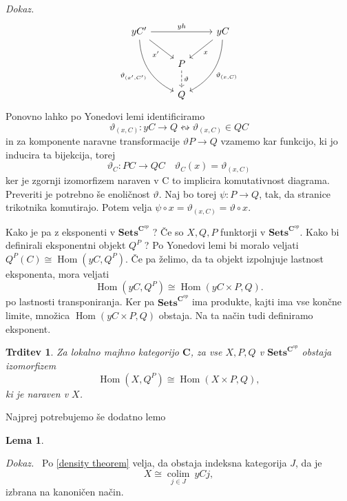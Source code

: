 \documentclass[12pt,a4paper]{book}
\theoremstyle{definition}
\theoremstyle{plain}
\newtheorem{trditev}[definicija]{Trditev}
\newtheorem{lema}[definicija]{Lema}
\newenvironment{dokaz}{\emph{Dokaz.}\ }{\hspace{\fill}{$\Box$}}
\theoremstyle{definition}
\theoremstyle{remark}
\newcommand{\cat}[1]{\textbf{#1}}
\DeclareMathOperator{\Hom}{Hom}
\DeclareMathOperator{\colim}{colim}
\newcommand{\predsnop}[1]{\cat{Sets}^{\cat{#1}^{op}}}
\begin{document}
\begin{dokaz}
$$\begin{tikzcd}
yC' \ar[rr, "yh"] \ar[ddr, bend right, "\vartheta_{(x',C')}"'] \ar[rd, "x'"'] & & yC \ar[ld, "x"] \ar[ddl, bend left, "\vartheta_{(x,C)}"] \\
& P \ar[d, dashed, "\vartheta"] & \\
& Q &
\end{tikzcd} $$
Ponovno lahko po Yonedovi lemi identificiramo 
$$\vartheta_{(x,C)}: yC \to Q \leftrightsquigarrow \vartheta_{(x,C)} \in QC$$
in za komponente naravne transformacije $\vartheta P \to Q$ vzamemo kar funkcijo, ki jo inducira ta bijekcija, torej 
$$\vartheta_C : PC \to QC \quad \vartheta_C(x) = \vartheta_{(x,C)}$$
ker je zgornji izomorfizem naraven v C to implicira komutativnost diagrama. Preveriti je potrebno še enoličnost $\vartheta$. Naj bo torej $\psi : P \to Q$, tak, da stranice trikotnika komutirajo. Potem velja $\psi \circ x = \vartheta_{(x,C)} = \vartheta \circ x$.
\end{dokaz}



Kako je pa z eksponenti v $\cat{Sets}^{\cat{C}^{op}}$ ? Če so $X,Q,P$ funktorji v $\predsnop{C}$. Kako bi definirali eksponentni objekt $Q^P$ ? Po Yonedovi lemi bi moralo veljati $Q^P(C) \cong \Hom(yC, Q^P)$. Če pa želimo, da ta objekt izpolnjuje lastnost eksponenta, mora veljati
$$\Hom(yC,Q^P) \cong \Hom(yC \times P, Q).$$
po lastnosti transponiranja. Ker pa $\predsnop{C}$ ima produkte, kajti ima vse končne limite, množica $\Hom(yC \times P, Q)$ obstaja. Na ta način tudi definiramo eksponent.

\begin{trditev}
Za lokalno majhno kategorijo $\cat{C}$, za vse $X,P,Q$ v $\predsnop{C}$ obstaja izomorfizem
$$\Hom(X,Q^P) \cong \Hom(X \times P, Q),$$
ki je naraven v $X$.
\end{trditev}


Najprej potrebujemo še dodatno lemo
\begin{lema}

\end{lema}


\begin{dokaz}
Po \ref{density theorem} velja, da obstaja indeksna kategorija $J$, da je
$$ X \cong \underset{j \in J}{\colim}\> yCj,$$
izbrana na kanoničen način.

\end{dokaz}
\end{document}
